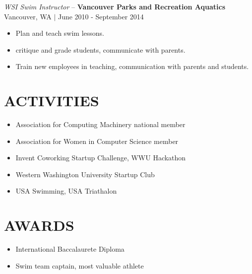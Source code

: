 \documentclass[line,margin]{res}
\begin{document}
\begin{resume}
	{\sl WSI Swim Instructor} -- {\bf Vancouver Parks and Recreation Aquatics} \\
	{\footnotesize Vancouver, WA $|$  June 2010 - September 2014} \\
	\begin{itemize}  \itemsep -2pt
		\item Plan and teach swim lessons.
		\item critique and grade students, communicate with parents.
		\item Train new employees in teaching, communication with parents and students.
	\end{itemize}

\section{ACTIVITIES}
	\begin{itemize} \itemsep -3pt
	\item Association for Computing Machinery national member
	\item Association for Women in Computer Science member
	\item Invent Coworking Startup Challenge, WWU Hackathon
	\item Western Washington University Startup Club
	\item USA Swimming, USA Triathalon
	\end{itemize}

\section{AWARDS}
	\begin{itemize} \itemsep -3pt
		\item International Baccalaurete Diploma
		\item Swim team captain, most valuable athlete
	\end{itemize}

\end{resume}
\end{document}
